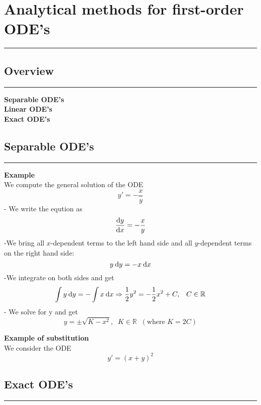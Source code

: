 \section{Analytical methods for first-order ODE’s}
\noindent\rule[\linienAbstand]{\linewidth}{\linienDickeDick}

\subsection{Overview}
\noindent\rule[\linienAbstand]{\linewidth}{\linienDicke}

\textbf{Separable ODE's}\\
\textbf{Linear ODE's}\\
\textbf{Exact ODE's}\\

\subsection{Separable ODE’s}
\noindent\rule[\linienAbstand]{\linewidth}{\linienDicke}
\textbf{Example}\\
We compute the general solution of the ODE
\begin{equation}
  y' = -\frac{x}{y}
\end{equation}
- We write the eqution as
\begin{equation}
  \frac{\textup{d}y}{\textup{d}x} = -\frac{x}{y}
\end{equation}
-We bring all $x$-dependent terms to the left hand side and all $y$-dependent terms on
the right hand side:
\begin{equation}
  y\:\textup{d}y = -x \:\textup{d}x
\end{equation}
-We integrate on both sides and get
\begin{equation}
  \int y\:\textup{d}y = - \int x\:\textup{d}x \Rightarrow \frac{1}{2}y^2 = - \frac{1}{2} x^2 + C, \;\;\; C \in \mathbb{R}
\end{equation}
- We solve for y and get
\begin{equation}
  y = \pm \sqrt{K - x^2}, \;\; K \in \mathbb{R}\;\; (\text{where } K = 2C)
\end{equation}

\textbf{Example of substitution}\\
We consider the ODE
\begin{equation}
  y' = (x + y)^2
\end{equation}


\subsection{Exact ODE’s}
\noindent\rule[\linienAbstand]{\linewidth}{\linienDicke}
